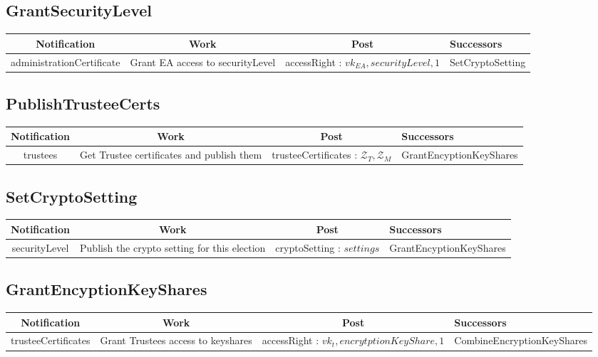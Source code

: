 \documentclass[bibtotoc,halfparskip,oneside]{scrreprt}
\begin{document}
\begin{landscape}
		\subsection{GrantSecurityLevel}
		\begin{tabularx}{\linewidth}{|c|c|c|X|}
			\hline Notification & Work & Post & Successors\\ 
			\hline administrationCertificate & Grant EA access to securityLevel & accessRight : $vk_{EA} , securityLevel, 1 $ & SetCryptoSetting \\ 
			\hline 
		\end{tabularx}
		
		\subsection{PublishTrusteeCerts}
		\begin{tabularx}{\linewidth}{|c|c|c|X|}
			\hline Notification & Work & Post & Successors\\ 
			\hline trustees & Get Trustee certificates and publish them & trusteeCertificates : $\mathcal{Z}_T , \mathcal{Z}_M$ & GrantEncyptionKeyShares \\ 
			\hline 
		\end{tabularx}
		
		\subsection{SetCryptoSetting}
		\begin{tabularx}{\linewidth}{|c|c|c|X|}
			\hline Notification & Work & Post & Successors\\  
			\hline securityLevel & Publish the crypto setting for this election &cryptoSetting : $settings$  & GrantEncyptionKeyShares \\
			
			\hline 
		\end{tabularx}
		
		\subsection{GrantEncyptionKeyShares}
		\begin{tabularx}{\linewidth}{|c|c|c|X|}
			\hline Notification & Work & Post & Successors\\  
			\hline  trusteeCertificates & Grant Trustees access to keyshares & accessRight : $vk_t, encrytptionKeyShare , 1 $ & CombineEncryptionKeyShares  \\  
			\hline 
		\end{tabularx}
		

\end{landscape}
\end{document}
